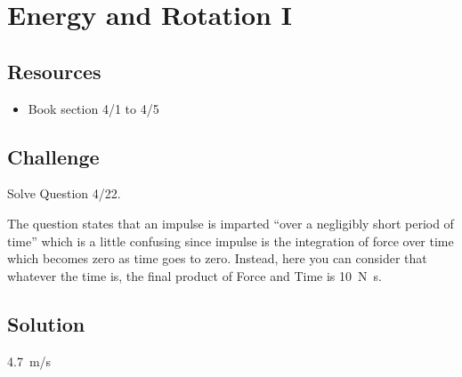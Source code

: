 %
%
%
%
%




\newpage
\section{Energy and Rotation I}

\subsection*{Resources}
\begin{itemize}
    \item Book section 4/1 to 4/5
\end{itemize}

\subsection*{Challenge}
Solve Question 4/22.

The question states that an impulse is imparted ``over a negligibly short period of time'' which is a little confusing since impulse is the integration of force over time which becomes zero as time goes to zero. Instead, here you can consider that whatever the time is, the final product of Force and Time is \SI{10}{\newton\second}.

\subsection*{Solution}
\SI{4.7}{m/s}




